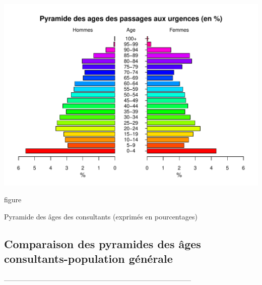 \documentclass[12pt,english,french,twoside]{book}\usepackage[]{graphicx}\usepackage[]{color}
\makeatletter
\def\maxwidth{ %
  \ifdim\Gin@nat@width>\linewidth
    \linewidth
  \else
    \Gin@nat@width
  \fi
}
\newenvironment{knitrout}{}{} %
\makeatother
\begin{document}
\begin{center}
\begin{knitrout}
\color{fgcolor}
\includegraphics[width=\maxwidth]{figure/pyr_consult_p100} 

\end{knitrout}

\end{center}
\caption{figure}{Pyramide des âges des consultants (exprimés en pourcentages)}
\label{fig:tranches_age31}


\subsection*{Comparaison des pyramides des âges consultants-population générale}
--------------------------------------------------------------------------------
\end{document}
